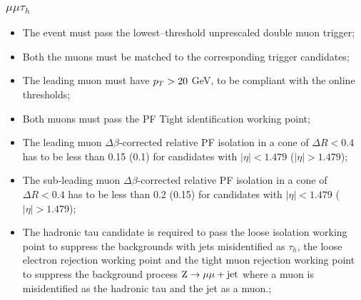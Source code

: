 \subsubsection{$\mu\mu\tau_h$}
\begin{itemize}
\item The event must pass the lowest--threshold unprescaled double muon trigger;
\item Both the muons must be matched to the corresponding trigger candidates;
\item The leading muon must have $p_{T} > 20$ GeV, to be compliant with the online thresholds;
\item Both muons must pass the PF Tight identification working point;
\item The leading muon $\Delta \beta$-corrected relative PF isolation in a cone of $\Delta R < 0.4$ has to be less than 0.15 (0.1) for candidates with $|\eta| < 1.479$ ($|\eta| > 1.479$);
\item The sub-leading muon $\Delta \beta$-corrected relative PF isolation in a cone of $\Delta R < 0.4$ has to be less than 0.2 (0.15) for candidates with $|\eta| < 1.479$ ($|\eta| > 1.479$);
\item The hadronic tau candidate is required to pass the loose isolation working point to suppress the backgrounds with jets misidentified as $\tau_h$, the loose electron rejection working point and the tight muon rejection working point to suppress the background process $\mathrm{Z}\rightarrow\mu\mu+\mathrm{jet}$ where a muon is misidentified as the hadronic tau and the jet as a muon.;
\end{itemize}

